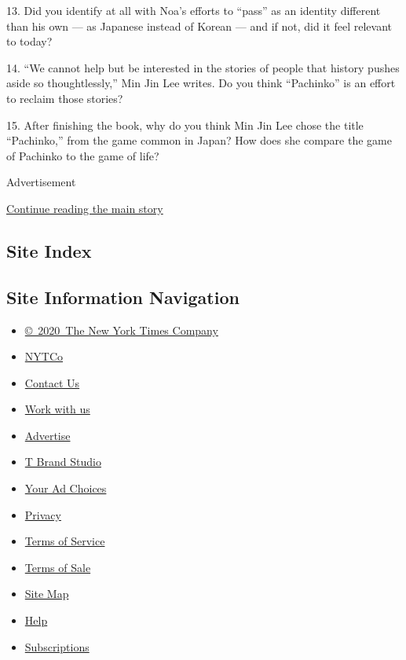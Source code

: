 13. Did you identify at all with Noa's efforts to ``pass'' as an
identity different than his own --- as Japanese instead of Korean ---
and if not, did it feel relevant to today?

14. ``We cannot help but be interested in the stories of people that
history pushes aside so thoughtlessly,'' Min Jin Lee writes. Do you
think ``Pachinko'' is an effort to reclaim those stories?

15. After finishing the book, why do you think Min Jin Lee chose the
title ``Pachinko,'' from the game common in Japan? How does she compare
the game of Pachinko to the game of life?

Advertisement

\protect\hyperlink{after-bottom}{Continue reading the main story}

\hypertarget{site-index}{%
\subsection{Site Index}\label{site-index}}

\hypertarget{site-information-navigation}{%
\subsection{Site Information
Navigation}\label{site-information-navigation}}

\begin{itemize}
\tightlist
\item
  \href{https://help.nytimes3xbfgragh.onion/hc/en-us/articles/115014792127-Copyright-notice}{©~2020~The
  New York Times Company}
\end{itemize}

\begin{itemize}
\tightlist
\item
  \href{https://www.nytco.com/}{NYTCo}
\item
  \href{https://help.nytimes3xbfgragh.onion/hc/en-us/articles/115015385887-Contact-Us}{Contact
  Us}
\item
  \href{https://www.nytco.com/careers/}{Work with us}
\item
  \href{https://nytmediakit.com/}{Advertise}
\item
  \href{http://www.tbrandstudio.com/}{T Brand Studio}
\item
  \href{https://www.nytimes3xbfgragh.onion/privacy/cookie-policy\#how-do-i-manage-trackers}{Your
  Ad Choices}
\item
  \href{https://www.nytimes3xbfgragh.onion/privacy}{Privacy}
\item
  \href{https://help.nytimes3xbfgragh.onion/hc/en-us/articles/115014893428-Terms-of-service}{Terms
  of Service}
\item
  \href{https://help.nytimes3xbfgragh.onion/hc/en-us/articles/115014893968-Terms-of-sale}{Terms
  of Sale}
\item
  \href{https://spiderbites.nytimes3xbfgragh.onion}{Site Map}
\item
  \href{https://help.nytimes3xbfgragh.onion/hc/en-us}{Help}
\item
  \href{https://www.nytimes3xbfgragh.onion/subscription?campaignId=37WXW}{Subscriptions}
\end{itemize}
